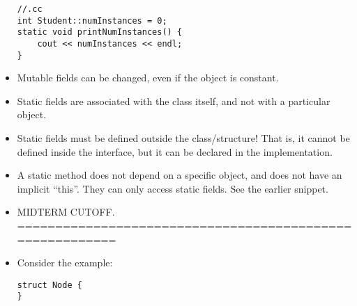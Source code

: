 \documentclass{article}
\begin{document}
\begin{itemize}
\begin{lstlisting}
//.cc
int Student::numInstances = 0;
static void printNumInstances() {
    cout << numInstances << endl;
}
\end{lstlisting}
\item Mutable fields can be changed, even if the object is constant.  
\item Static fields are associated with the class itself, and not with a particular object.
\item Static fields must be defined outside the class/structure!  That is, it cannot be defined inside the interface, but it can be declared in the implementation.
\item A static method does not depend on a specific object, and does not have an implicit ``this''.  They can only access static fields.  See the earlier snippet.
\item MIDTERM CUTOFF.  =========================================================
\item Consider the example:
\begin{lstlisting}
struct Node {
}


\end{lstlisting}
\end{itemize}
\end{document}
